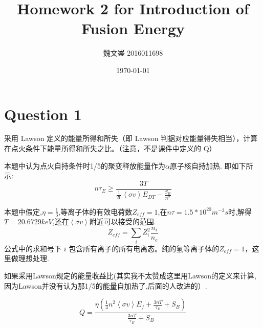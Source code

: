 \documentclass[UTF8,a4paper,10pt]{ctexart}
\title{Homework 2 for Introduction of Fusion Energy}
\author{魏文崟 2016011698}
\date{\today}
\begin{document}
        \maketitle
        \thispagestyle{fancy}

    \setlength{\oddsidemargin}{ 1cm}  %
    \setlength{\evensidemargin}{\oddsidemargin}
    \setlength{\textwidth}{13.50cm}
    \vspace{-.8cm}
    \begin{center}
	\end{center}





    \setlength{\oddsidemargin}{-.5cm}  %
    \setlength{\evensidemargin}{\oddsidemargin}
    \setlength{\textwidth}{17.00cm}




\section*{Question 1}
采用 Lawson 定义的能量所得和所失（即 Lawson 判据对应能量得失相当），计算在点火条件下能量所得和所失之比。（注意，不是课件中定义的 Q）

本题中认为点火自持条件时1/5的聚变释放能量作为$\alpha$原子核自持加热.
即如下所示:
\begin{equation}
    n\tau_E\geq\frac{3T}{\frac{1}{20}\left \langle \sigma v \right \rangle E_{DT}-\frac{S_B}{n^2}}
\end{equation}

本题中假定,$\eta=\frac{1}{3}$,等离子体的有效电荷数$Z_{eff}=1$,在$n\tau=1.5*10^20m^{-3}s$时,解得$T=20.6729keV$,还在$\left \langle \sigma v \right \rangle$附近可以接受的范围.
\begin{equation*}
    Z_{eff}=\sum\limits_i Z_i^2\frac{n_i}{n_e}
\end{equation*}
公式中的求和号下 $i$ 包含所有离子的所有电离态。纯的氢等离子体的$Z_{eff}=1$，这里做理想处理.

如果采用Lawson规定的能量收益比(其实我不太赞成这里用Lawson的定义来计算,因为Lawson并没有认为那1/5的能量自加热了,后面的人改进的）.

\begin{equation}
    Q=\frac{\eta(\frac{1}{4}n^2\left \langle \sigma v \right \rangle E_f+\frac{3nT}{\tau_E}+S_B)}{\frac{3nT}{\tau_E}+S_B}
\end{equation}
\end{document}
